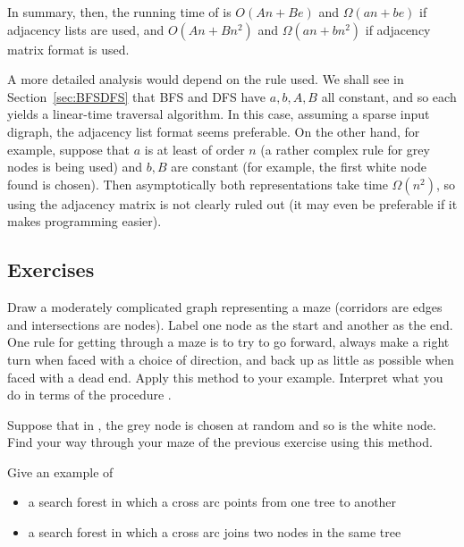 In summary, then, the running time of  is $O(An + Be)$
and $\Omega(an + be)$ if adjacency lists are used, and $O(A n + B n^2)$ and $\Omega(an + bn^2)$ if adjacency matrix format is used.

A more detailed analysis would depend on the rule used. We shall see in
Section~\ref{sec:BFSDFS} that BFS and DFS have $a, b, A, B$ all constant,
and so each yields a linear-time traversal algorithm. In this case,
assuming a sparse input digraph, the adjacency list format seems
preferable. On the other hand, for example, suppose that $a$ is at least of
order $n$ (a rather complex rule for grey nodes is being used) and $b, B$
are constant (for example, the first white node found is chosen). Then
asymptotically both representations take time $\Omega(n^2)$, so using the
adjacency matrix is not clearly ruled out (it may even be preferable if it
makes programming easier).

\subsection*{Exercises}

\begin{Exercise}
\label{ex:trav-maze}
Draw a moderately complicated graph representing a maze (corridors are
edges and intersections are nodes). Label one node as the start and
another as the end.  One rule for getting through a maze is to  try to
go forward, always make a right turn when faced with a choice of
direction, and back up as little as possible when faced with a dead end.
Apply this method to your example. Interpret what you do in terms of the
procedure .

\end{Exercise}

\begin{Exercise}
\label{ex:trav-maze-random}
Suppose that in , the grey node is chosen at random and
so is the white node. Find your way through your maze of the previous
exercise using this method.

\end{Exercise}


\begin{Exercise}
\label{ex:trav-cross}

Give an example of 
\begin{itemize}
\item a search forest in which a cross arc points from one tree to 
another
\item a  search forest in which a cross arc joins two nodes in the same 
tree
\end{itemize}

\end{Exercise}


